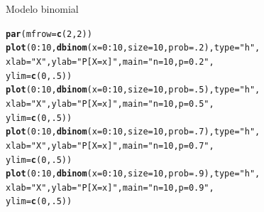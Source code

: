 \documentclass[10pt]{beamer}\usepackage[]{graphicx}\usepackage[]{color}
\makeatletter
\newcommand{\hlnum}[1]{\textcolor[rgb]{0.686,0.059,0.569}{#1}}%
\newcommand{\hlstr}[1]{\textcolor[rgb]{0.192,0.494,0.8}{#1}}%
\newcommand{\hlopt}[1]{\textcolor[rgb]{0,0,0}{#1}}%
\newcommand{\hlstd}[1]{\textcolor[rgb]{0.345,0.345,0.345}{#1}}%
\newcommand{\hlkwc}[1]{\textcolor[rgb]{0.333,0.667,0.333}{#1}}%
\newcommand{\hlkwd}[1]{\textcolor[rgb]{0.737,0.353,0.396}{\textbf{#1}}}%
\newenvironment{kframe}{%
 \def\at@end@of@kframe{}%
 \ifinner\ifhmode%
  \def\at@end@of@kframe{\end{minipage}}%
  \begin{minipage}{\columnwidth}%
 \fi\fi%
 \def\FrameCommand##1{\hskip\@totalleftmargin \hskip-\fboxsep
 \colorbox{shadecolor}{##1}\hskip-\fboxsep
     \hskip-\linewidth \hskip-\@totalleftmargin \hskip\columnwidth}%
 \MakeFramed {\advance\hsize-\width
   \@totalleftmargin\z@ \linewidth\hsize
   \@setminipage}}%
 {\par\unskip\endMakeFramed%
 \at@end@of@kframe}
\newenvironment{knitrout}{}{} %
\theoremstyle{definition}
\makeatother
\begin{document}
\begin{frame}[fragile]{Modelo binomial}
\begin{knitrout}\small
{}\color{fgcolor}\begin{kframe}
\begin{alltt}
\hlkwd{par}\hlstd{(}\hlkwc{mfrow}\hlstd{=}\hlkwd{c}\hlstd{(}\hlnum{2}\hlstd{,}\hlnum{2}\hlstd{))}
\hlkwd{plot}\hlstd{(}\hlnum{0}\hlopt{:}\hlnum{10}\hlstd{,} \hlkwd{dbinom}\hlstd{(}\hlkwc{x} \hlstd{=} \hlnum{0}\hlopt{:}\hlnum{10}\hlstd{,} \hlkwc{size} \hlstd{=} \hlnum{10}\hlstd{,} \hlkwc{prob} \hlstd{=} \hlnum{.2}\hlstd{),} \hlkwc{type} \hlstd{=} \hlstr{"h"}\hlstd{,}
     \hlkwc{xlab} \hlstd{=} \hlstr{"X"}\hlstd{,} \hlkwc{ylab} \hlstd{=} \hlstr{"P[X = x]"}\hlstd{,} \hlkwc{main} \hlstd{=} \hlstr{"n = 10, p = 0.2"}\hlstd{,}
     \hlkwc{ylim} \hlstd{=} \hlkwd{c}\hlstd{(}\hlnum{0}\hlstd{,}\hlnum{.5}\hlstd{))}
\hlkwd{plot}\hlstd{(}\hlnum{0}\hlopt{:}\hlnum{10}\hlstd{,} \hlkwd{dbinom}\hlstd{(}\hlkwc{x} \hlstd{=} \hlnum{0}\hlopt{:}\hlnum{10}\hlstd{,} \hlkwc{size} \hlstd{=} \hlnum{10}\hlstd{,} \hlkwc{prob} \hlstd{=} \hlnum{.5}\hlstd{),} \hlkwc{type} \hlstd{=} \hlstr{"h"}\hlstd{,}
     \hlkwc{xlab} \hlstd{=} \hlstr{"X"}\hlstd{,} \hlkwc{ylab} \hlstd{=} \hlstr{"P[X = x]"}\hlstd{,} \hlkwc{main} \hlstd{=} \hlstr{"n = 10, p = 0.5"}\hlstd{,}
     \hlkwc{ylim} \hlstd{=} \hlkwd{c}\hlstd{(}\hlnum{0}\hlstd{,}\hlnum{.5}\hlstd{))}
\hlkwd{plot}\hlstd{(}\hlnum{0}\hlopt{:}\hlnum{10}\hlstd{,} \hlkwd{dbinom}\hlstd{(}\hlkwc{x} \hlstd{=} \hlnum{0}\hlopt{:}\hlnum{10}\hlstd{,} \hlkwc{size} \hlstd{=} \hlnum{10}\hlstd{,} \hlkwc{prob} \hlstd{=} \hlnum{.7}\hlstd{),} \hlkwc{type} \hlstd{=} \hlstr{"h"}\hlstd{,}
     \hlkwc{xlab} \hlstd{=} \hlstr{"X"}\hlstd{,} \hlkwc{ylab} \hlstd{=} \hlstr{"P[X = x]"}\hlstd{,} \hlkwc{main} \hlstd{=} \hlstr{"n = 10, p = 0.7"}\hlstd{,}
     \hlkwc{ylim} \hlstd{=} \hlkwd{c}\hlstd{(}\hlnum{0}\hlstd{,}\hlnum{.5}\hlstd{))}
\hlkwd{plot}\hlstd{(}\hlnum{0}\hlopt{:}\hlnum{10}\hlstd{,} \hlkwd{dbinom}\hlstd{(}\hlkwc{x} \hlstd{=} \hlnum{0}\hlopt{:}\hlnum{10}\hlstd{,} \hlkwc{size} \hlstd{=} \hlnum{10}\hlstd{,} \hlkwc{prob} \hlstd{=} \hlnum{.9}\hlstd{),} \hlkwc{type} \hlstd{=} \hlstr{"h"}\hlstd{,}
     \hlkwc{xlab} \hlstd{=} \hlstr{"X"}\hlstd{,} \hlkwc{ylab} \hlstd{=} \hlstr{"P[X = x]"}\hlstd{,} \hlkwc{main} \hlstd{=} \hlstr{"n = 10, p = 0.9"}\hlstd{,}
     \hlkwc{ylim} \hlstd{=} \hlkwd{c}\hlstd{(}\hlnum{0}\hlstd{,}\hlnum{.5}\hlstd{))}
\end{alltt}
\end{kframe}
\end{knitrout}
\end{frame}
\end{document}
